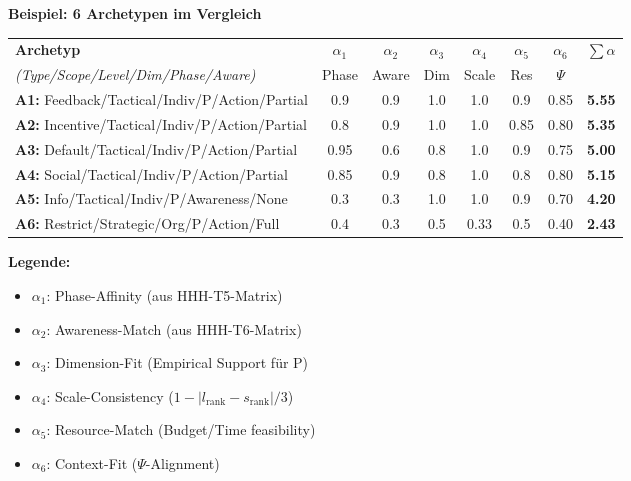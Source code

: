 \begin{tcolorbox}[colback=yellow!5!white, colframe=yellow!75!black,
    title=\textbf{Schritt 2: Alignment-Komponenten $\alpha_i$ für jeden Archetyp berechnen}]

\textbf{Beispiel: 6 Archetypen im Vergleich}

\medskip
\renewcommand{\arraystretch}{1.2}
\begin{tabular}{@{}lcccccc|c@{}}
\toprule
\textbf{Archetyp} & $\alpha_1$ & $\alpha_2$ & $\alpha_3$ & $\alpha_4$ & $\alpha_5$ & $\alpha_6$ & $\sum\alpha$ \\
\textit{(Type/Scope/Level/Dim/Phase/Aware)} & \scriptsize Phase & \scriptsize Aware & \scriptsize Dim & \scriptsize Scale & \scriptsize Res & \scriptsize $\Psi$ & \\
\midrule
\textbf{A1:} Feedback/Tactical/Indiv/P/Action/Partial & 0.9 & 0.9 & 1.0 & 1.0 & 0.9 & 0.85 & \textbf{5.55} \\
\textbf{A2:} Incentive/Tactical/Indiv/P/Action/Partial & 0.8 & 0.9 & 1.0 & 1.0 & 0.85 & 0.80 & \textbf{5.35} \\
\textbf{A3:} Default/Tactical/Indiv/P/Action/Partial & 0.95 & 0.6 & 0.8 & 1.0 & 0.9 & 0.75 & \textbf{5.00} \\
\textbf{A4:} Social/Tactical/Indiv/P/Action/Partial & 0.85 & 0.9 & 0.8 & 1.0 & 0.8 & 0.80 & \textbf{5.15} \\
\textbf{A5:} Info/Tactical/Indiv/P/Awareness/None & 0.3 & 0.3 & 1.0 & 1.0 & 0.9 & 0.70 & \textbf{4.20} \\
\textbf{A6:} Restrict/Strategic/Org/P/Action/Full & 0.4 & 0.3 & 0.5 & 0.33 & 0.5 & 0.40 & \textbf{2.43} \\
\bottomrule
\end{tabular}

\medskip
\textbf{Legende:}
\begin{itemize}[nosep]
    \item $\alpha_1$: Phase-Affinity (aus HHH-T5-Matrix)
    \item $\alpha_2$: Awareness-Match (aus HHH-T6-Matrix)
    \item $\alpha_3$: Dimension-Fit (Empirical Support für P)
    \item $\alpha_4$: Scale-Consistency ($1 - |l_{\text{rank}} - s_{\text{rank}}|/3$)
    \item $\alpha_5$: Resource-Match (Budget/Time feasibility)
    \item $\alpha_6$: Context-Fit ($\Psi$-Alignment)
\end{itemize}

\end{tcolorbox}

